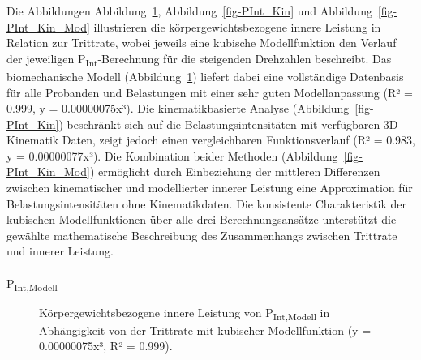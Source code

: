 \documentclass[
  letterpaper,
  DIV=11]{scrartcl}
\makeatletter
\let\oldparagraph\paragraph
\renewcommand{\paragraph}{
    \@ifstar
      \xxxParagraphStar
      \xxxParagraphNoStar
  }
\newcommand{\xxxParagraphStar}[1]{\oldparagraph*{#1}\mbox{}}
\newcommand{\xxxParagraphNoStar}[1]{\oldparagraph{#1}\mbox{}}
\makeatother
\begin{document}
Die Abbildungen Abbildung~\ref{fig-PInt_Mod},
Abbildung~\ref{fig-PInt_Kin} und Abbildung~\ref{fig-PInt_Kin_Mod}
illustrieren die körpergewichtsbezogene innere Leistung in Relation zur
Trittrate, wobei jeweils eine kubische Modellfunktion den Verlauf der
jeweiligen P\textsubscript{Int}-Berechnung für die steigenden Drehzahlen
beschreibt. Das biomechanische Modell (Abbildung~\ref{fig-PInt_Mod})
liefert dabei eine vollständige Datenbasis für alle Probanden und
Belastungen mit einer sehr guten Modellanpassung (R² = 0.999, y =
0.00000075x³). Die kinematikbasierte Analyse
(Abbildung~\ref{fig-PInt_Kin}) beschränkt sich auf die
Belastungsintensitäten mit verfügbaren 3D-Kinematik Daten, zeigt jedoch
einen vergleichbaren Funktionsverlauf (R² = 0.983, y = 0.00000077x³).
Die Kombination beider Methoden (Abbildung~\ref{fig-PInt_Kin_Mod})
ermöglicht durch Einbeziehung der mittleren Differenzen zwischen
kinematischer und modellierter innerer Leistung eine Approximation für
Belastungsintensitäten ohne Kinematikdaten. Die konsistente
Charakteristik der kubischen Modellfunktionen über alle drei
Berechnungsansätze unterstützt die gewählte mathematische Beschreibung
des Zusammenhangs zwischen Trittrate und innerer Leistung.

\paragraph{\texorpdfstring{P\textsubscript{Int,Modell}}{PInt,Modell}}

\begin{figure}


\caption{\label{fig-PInt_Mod}Körpergewichtsbezogene innere Leistung von
P\textsubscript{Int,Modell} in Abhängigkeit von der Trittrate mit
kubischer Modellfunktion (y = 0.00000075x³, R² = 0.999).}

\end{figure}%
\end{document}
